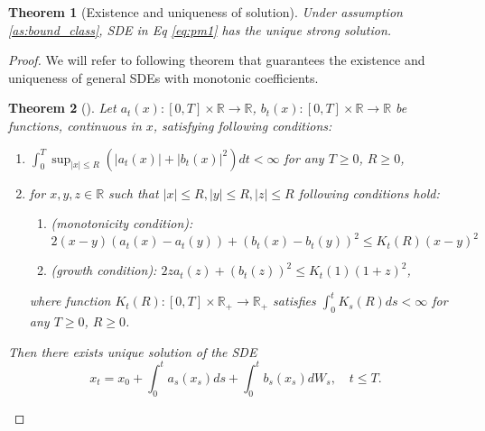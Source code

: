 \documentclass[11pt,a4paper] {article}
\newtheorem{theorem}{Theorem}[section]
\begin{document}
\begin{theorem}[Existence and uniqueness of solution]\label{th:ExistQuadDrift}
Under assumption \ref{as:bound_class}, SDE in Eq \eqref{eq:pm1} has the unique strong solution.
\end{theorem}
\begin{proof}

We will refer to following theorem that guarantees the existence and uniqueness of general SDEs with monotonic coefficients.

\begin{theorem}[\cite{GyonKryl}]%
Let $a_t(x): [0,T]\times \mathbb{R}\to \mathbb{R}$, $b_t(x): [0,T]\times \mathbb{R}\to \mathbb{R}$ be functions, continuous in $x$, satisfying following conditions:
\begin{enumerate}
\item $\int_0^T \sup_{|x|\le R}\left(|a_t(x)| +|b_t(x)|^2\right)dt<\infty$ for any $T\ge 0$, $R\ge 0$,
\item for $x,y,z\in \mathbb{R}$ such that $|x|\le R, |y|\le R, |z|\le R$ following conditions hold:
\begin{enumerate}%
\item\label{it:monoton_cond}(monotonicity condition):
\begin{equation}
2(x-y)(a_t(x)-a_t(y))+(b_t(x)-b_t(y))^2\le K_t(R)(x-y)^2
\end{equation}
\item\label{it:growth_cond} (growth condition): $2za_t(z)+(b_t(z))^2\le K_t(1)(1+z)^2$,
\end{enumerate}
where function $K_t(R): [0,T]\times \mathbb{R}_+\to \mathbb{R}_+$ satisfies $\int_0^t K_s(R)ds<\infty$  for any $T\ge 0$, $R\ge 0$.
\end{enumerate}

Then there exists unique solution of the SDE
\begin{equation}
x_t=x_0+\int_0^ta_s(x_s)ds + \int_0^tb_s(x_s)dW_s,\quad t\le T.
\end{equation}
\end{theorem}


\end{proof}
\end{document}
